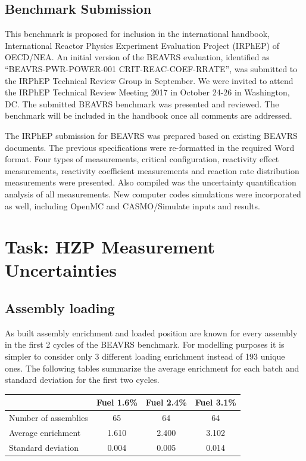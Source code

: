 \documentclass{article}
\begin{document}
\subsection{Benchmark Submission}

This benchmark is proposed for inclusion in the international handbook, International Reactor Physics Experiment Evaluation Project (IRPhEP) of OECD/NEA. An initial version of the BEAVRS evaluation, identified as “BEAVRS-PWR-POWER-001 CRIT-REAC-COEF-RRATE”, was submitted to the IRPhEP Technical Review Group in September. We were invited to attend the IRPhEP Technical Review Meeting 2017 in October 24-26 in Washington, DC. The submitted BEAVRS benchmark was presented and reviewed. The benchmark will be included in the handbook once all comments are addressed.

The IRPhEP submission for BEAVRS was prepared based on existing BEAVRS documents. The previous specifications were re-formatted in the required Word format. Four types of measurements, critical configuration, reactivity effect measurements, reactivity coefficient measurements and reaction rate distribution measurements were presented.  Also compiled was the uncertainty quantification analysis of all measurements. New computer codes simulations were incorporated as well, including OpenMC and CASMO/Simulate inputs and results.

\section{Task: HZP Measurement Uncertainties}

\subsection{Assembly loading}

As built assembly enrichment and loaded position are known for every assembly in the first 2 cycles of the BEAVRS benchmark. For modelling purposes it is simpler to consider only 3 different loading enrichment instead of 193 unique ones.  The following tables summarize the average enrichment for each batch and standard deviation for the first two cycles.

\begin{center}
\begin{tabular}{ l c c c }
\hline
  & Fuel 1.6\% & Fuel 2.4\% & Fuel 3.1\% \\
\hline  
  Number of assemblies & 65 & 64 & 64\\
  Average enrichment & 1.610 & 2.400 & 3.102 \\
  Standard deviation & 0.004 & 0.005 & 0.014 \\
\hline  
\end{tabular}
\end{center}
\end{document}
